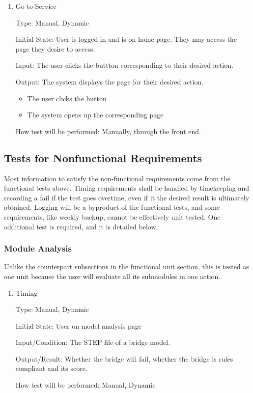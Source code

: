 \documentclass[12pt, titlepage]{article}
\begin{document}
\begin{enumerate}

\item{Go to Service\\}

Type: Manual, Dynamic
					
Initial State: User is logged in and is on home page. They may access the page they desire to access.
					
Input: The user clicks the buttton corresponding to their desired action.
					
Output: The system displays the page for their desired action.

\begin{itemize}
  \item The user clicks the button
  \item The system opens up the corresponding page
\end{itemize}

How test will be performed: Manually, through the front end. 
    
\end{enumerate}

\subsection{Tests for Nonfunctional Requirements}


Most information to satisfy the non-functional requirements come from the functional tests above.
Timing requirements shall be handled by timekeeping and recording a fail if the test goes overtime, even if it
the desired result is ultimately obtained. Logging will be a byproduct of the functional tests, and some requirements,
like weekly backup, cannot be effectively unit tested. One additional test is required, and it is detailed below.

\subsubsection{Module Analysis}

Unlike the counterpart subsections in the functional unit section, this is tested as one unit
because the user will evaluate all its submodules in one action.
		
\begin{enumerate}

\item{Timing\\}

Type: Manual, Dynamic
					
Initial State: User on model analysis page
					
Input/Condition: The STEP file of a bridge model.
					
Output/Result: Whether the bridge will fail, whether the bridge is rules compliant and its score.
					
How test will be performed: Manual, Dynamic

\end{enumerate}
\end{document}
